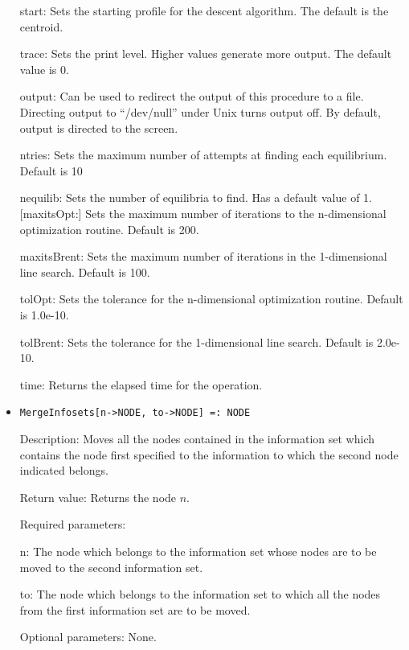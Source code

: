 \begin{itemize}
\bd
\item
[start:] Sets the starting profile for the descent algorithm.  The
default is the centroid.
\item
[trace:] Sets the print level.  Higher values generate more output.
The default value is 0.
\item
[output:] Can be used to redirect the output of this procedure to a
file.  Directing output to ``/dev/null'' under Unix turns output off.
By default, output is directed to the screen.
\item
[ntries:] Sets the maximum number of attempts at finding each
equilibrium. Default is 10
\item
[nequilib:] Sets the number of equilibria to find.  Has a default
value of 1.  [maxitsOpt:] Sets the maximum number of iterations to the
n-dimensional optimization routine.  Default is 200.
\item
[maxitsBrent:] Sets the maximum number of iterations in the
1-dimensional line search.  Default is 100.
\item
[tolOpt:] Sets the tolerance for the n-dimensional optimization
routine.  Default is 1.0e-10.
\item
[tolBrent:] Sets the tolerance for the 1-dimensional line search.
Default is 2.0e-10.
\item
[time:] Returns the elapsed time for the operation.
\ed
\ed


\item
\protect \large \begin{verbatim}
MergeInfosets[n->NODE, to->NODE] =: NODE
\end{verbatim}\normalsize

\bd
\item
[Description:] Moves all the nodes contained in the information set
which contains the node first specified to the information to which
the second node indicated belongs.
\item
[Return value:] Returns the node $n$.
\item
[Required parameters:]\hfil\null

\bd
\item
[n:] The node which belongs to the information set whose nodes are to
be moved to the second information set.
\item
[to:] The node which belongs to the information set to which all the
nodes from the first information set are to be moved.
\ed

\item
[Optional parameters:] None.
\ed


\end{itemize}
